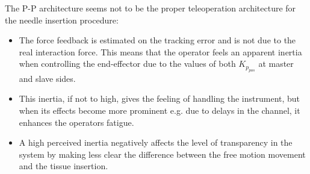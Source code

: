 The P-P architecture seems not to be the proper teleoperation architecture for the needle insertion procedure: 
\begin{itemize}
	\item The force feedback is estimated on the tracking error and is not due to the real interaction force.
This means that the operator feels an apparent inertia when controlling the end-effector due to the values of both $K_{p_{pos}}$ at master and slave sides.
	\item This inertia, if not to high, gives the feeling of handling the instrument, but when its effects become more prominent e.g. due to delays in the channel, it enhances the operators fatigue.
	\item A high perceived inertia negatively affects the level of transparency in the system by making less clear the difference between the free motion movement and the tissue insertion.
\end{itemize}

